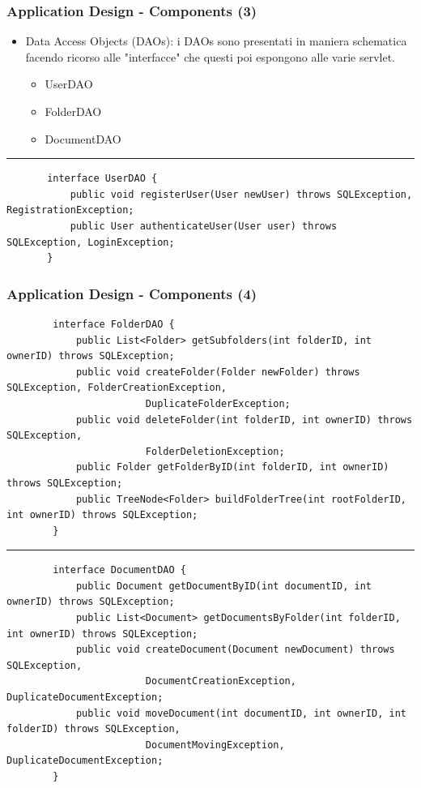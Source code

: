 \documentclass[aspectratio=169]{beamer}
\begin{document}
\begin{frame}[fragile]
    \frametitle{Application Design - Components (3)}
    \begin{itemize}
        \item Data Access Objects (DAOs): i DAOs sono presentati in maniera schematica facendo ricorso alle
              "interfacce" che questi poi espongono alle varie servlet.
              \begin{itemize}
                  \item UserDAO
                  \item FolderDAO
                  \item DocumentDAO
              \end{itemize}
    \end{itemize}

    \scriptsize
    \rule{\textwidth}{0.25pt}
    \begin{verbatim}
       interface UserDAO {
           public void registerUser(User newUser) throws SQLException, RegistrationException;
           public User authenticateUser(User user) throws SQLException, LoginException;
       }
    \end{verbatim}
\end{frame}

\begin{frame}[fragile]
    \frametitle{Application Design - Components (4)}
    \scriptsize
    \begin{verbatim}
        interface FolderDAO {
            public List<Folder> getSubfolders(int folderID, int ownerID) throws SQLException;
            public void createFolder(Folder newFolder) throws SQLException, FolderCreationException,
                        DuplicateFolderException;
            public void deleteFolder(int folderID, int ownerID) throws SQLException,
                        FolderDeletionException;
            public Folder getFolderByID(int folderID, int ownerID) throws SQLException;
            public TreeNode<Folder> buildFolderTree(int rootFolderID, int ownerID) throws SQLException;
        }
    \end{verbatim}
    \rule{\textwidth}{0.25pt}
    \scriptsize
    \begin{verbatim}
        interface DocumentDAO {
            public Document getDocumentByID(int documentID, int ownerID) throws SQLException;
            public List<Document> getDocumentsByFolder(int folderID, int ownerID) throws SQLException;
            public void createDocument(Document newDocument) throws SQLException,
                        DocumentCreationException, DuplicateDocumentException;
            public void moveDocument(int documentID, int ownerID, int folderID) throws SQLException,
                        DocumentMovingException, DuplicateDocumentException;
        }
    \end{verbatim}
\end{frame}
\end{document}
